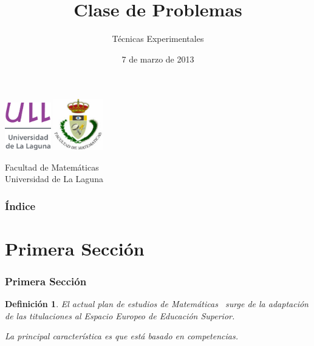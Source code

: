 \documentclass{beamer}
\title[Presentación con Beamer]{Clase de Problemas }
\author[Técnicas Experimentales]{Técnicas Experimentales}
\date[07-03-2013]{7 de marzo de 2013}
\newtheorem{definicion}{Definición}
\begin{document}
  
\begin{frame}

  \includegraphics[width=0.15\textwidth]{img/ullesc.eps}
  \hspace*{7.5cm}
  \includegraphics[width=0.16\textwidth]{img/fmatesc.eps}
  \titlepage

  \begin{scriptsize}
    \begin{center}
     Facultad de Matemáticas \\
     Universidad de La Laguna
    \end{center}
  \end{scriptsize}

\end{frame}

\begin{frame}
  \frametitle{Índice}  
  \tableofcontents[pausesections]
\end{frame}


\section{Primera Sección}


\begin{frame}

\frametitle{Primera Sección}

\begin{definicion}
El actual plan de estudios de \alert{Matemáticas}~\cite{plan} surge de la adaptación de las 
titulaciones al Espacio Europeo de Educación Superior.

La principal característica es que está basado en competencias. 

\end{definicion}

\end{frame}
\end{document}
